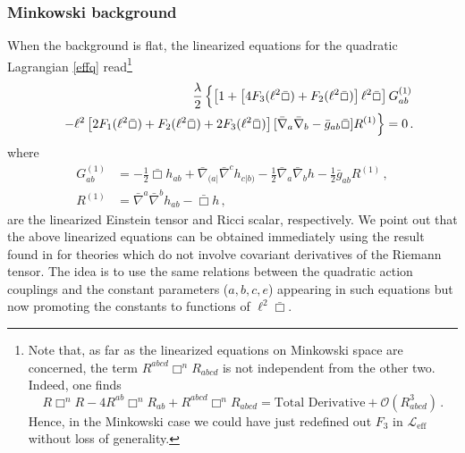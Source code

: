 \documentclass[11pt]{article}
\newcommand{\bea}{\begin{eqnarray}}
\newcommand{\eea}{\end{eqnarray}}
\begin{document}
\subsubsection{Minkowski background}\label{minko}
When the background is flat, the linearized equations for the quadratic Lagrangian \eqref{effq} read\footnote{Note that, as far as the linearized equations on Minkowski space are concerned,  the term $R^{abcd} \Box^n R_{abcd}$ is not independent from the other two. Indeed, one finds %
\begin{equation}
    R \Box^n R - 4 R^{ab} \Box^n R_{ab} + R^{abcd} \Box^n R_{abcd} = \text{Total Derivative} + \mathcal{O}(R_{abcd}^3) \,.
\end{equation}
Hence, in the Minkowski case we could have just redefined out $F_3$ in $\mathcal{L}_{\text{eff}}$ without loss of generality. }
\bea \notag
&&\frac{\lambda}{2} \left\{ \left[1+\left[4F_3(\ell^2 \bar \Box)+F_2(\ell^2 \bar \Box)\right] \ell^2\bar\Box \right] G_{ab}^{(1)} \right. \\ && \left.-\ell^2\left[ 2F_1(\ell^2 \bar \Box)+F_2(\ell^2 \bar \Box)+2F_3(\ell^2 \bar \Box)\right][ \bar\nabla_a\bar\nabla_b-\bar g_{ab}\bar \Box]R^{(1)} \right\} =0\, . \label{lineareqs}
\eea
where
\begin{align}
G_{ab}^{(1)}&=-\frac{1}{2}\bar\Box h_{ab}+\bar\nabla_{(a|}\bar\nabla^{c}h_{c|b)}-\frac{1}{2}\bar\nabla_{a}\bar\nabla_{b}h-\frac{1}{2}\bar g_{ab} R^{(1)}\, ,\\
R^{(1)}&=\bar\nabla^{a}\bar\nabla^{b}h_{ab}-\bar \Box h\, ,
\end{align}
are the linearized Einstein tensor and Ricci scalar, respectively. We point out that the above linearized equations can be obtained immediately using the result found in \cite{Aspects} for theories which do not involve covariant derivatives of the Riemann tensor. The idea is to use the same relations between the quadratic action couplings and the constant parameters ($a,b,c,e$) appearing in such equations but now promoting the constants to functions of $\ell^2\bar \Box$. %
\end{document}
